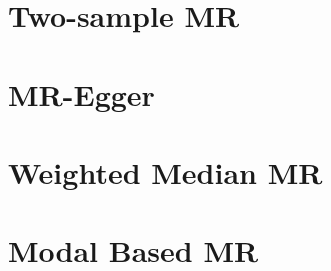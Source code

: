\documentclass[]{book}
\theoremstyle{definition}
\theoremstyle{definition}
\theoremstyle{definition}
\theoremstyle{remark}
\begin{document}
\section{Two-sample MR}\label{two-sample-mr}

\section{MR-Egger}\label{mr-egger}

\section{Weighted Median MR}\label{weighted-median-mr}

\section{Modal Based MR}\label{modal-based-mr}


\end{document}
